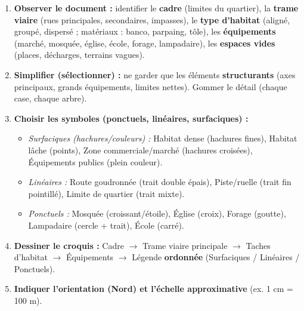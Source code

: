 \documentclass[11pt]{article}
\begin{document}
\begin{methode}
\begin{enumerate}
    \item \textbf{Observer le document :} identifier le \textbf{cadre} (limites du quartier), la \textbf{trame viaire} (rues principales, secondaires, impasses), le \textbf{type d'habitat} (aligné, groupé, dispersé ; matériaux : banco, parpaing, tôle), les \textbf{équipements} (marché, mosquée, église, école, forage, lampadaire), les \textbf{espaces vides} (places, décharges, terrains vagues).
    \item \textbf{Simplifier (sélectionner) :} ne garder que les éléments \textbf{structurants} (axes principaux, grands équipements, limites nettes). Gommer le détail (chaque case, chaque arbre).
    \item \textbf{Choisir les symboles (ponctuels, linéaires, surfaciques) :}
    \begin{itemize}
        \item \textit{Surfaciques (hachures/couleurs) :} Habitat dense (hachures fines), Habitat lâche (points), Zone commerciale/marché (hachures croisées), Équipements publics (plein couleur).
        \item \textit{Linéaires :} Route goudronnée (trait double épais), Piste/ruelle (trait fin pointillé), Limite de quartier (trait mixte).
        \item \textit{Ponctuels :} Mosquée (croissant/étoile), Église (croix), Forage (goutte), Lampadaire (cercle + trait), École (carré).
    \end{itemize}
    \item \textbf{Dessiner le croquis :} Cadre $\rightarrow$ Trame viaire principale $\rightarrow$ Taches d'habitat $\rightarrow$ Équipements $\rightarrow$ Légende \textbf{ordonnée} (Surfaciques / Linéaires / Ponctuels).
    \item \textbf{Indiquer l'orientation (Nord) et l'échelle approximative} (ex. 1 cm = 100 m).
\end{enumerate}
\end{methode}
\end{document}
